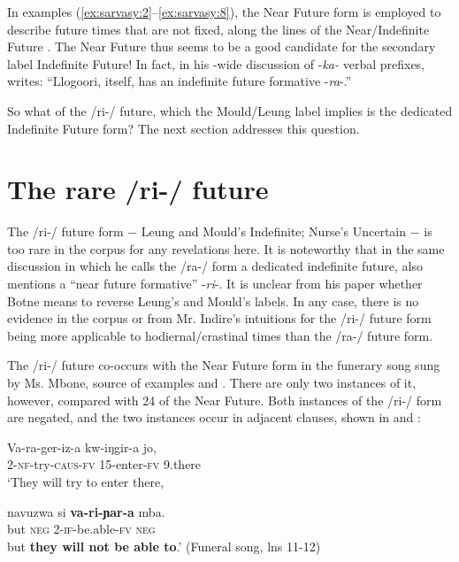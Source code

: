 \documentclass[output=paper]{langsci/langscibook}
\begin{document}
In examples (\ref{ex:sarvasy:2}--\ref{ex:sarvasy:8}), the Near Future form is employed to describe future times that are not fixed, along the lines of the  Near/Indefinite Future \citep[20]{Johnson1977}. The  Near Future thus seems to be a good candidate for the secondary label Indefinite Future! In fact, in his -wide discussion of -\textit{ka-} verbal prefixes, \citet[492]{Botne1999} writes: “Llogoori, itself, has an indefinite future formative -\textit{ra}-.” 

So what of the  /ri-/ future, which the Mould/Leung label implies is the dedicated Indefinite Future form? The next section addresses this question.

\section[The rare /ri-/ future]{The rare /ri-/ future}
\label{sec:sarvasy:4}

The /ri-/ future form $-$ Leung and Mould’s Indefinite; Nurse’s Uncertain $-$ is too rare in the corpus for any revelations here. It is noteworthy that in the same discussion in which he calls the  /ra-/ form a dedicated indefinite future, \citet[491]{Botne1999} also mentions a  “near future formative” -\textit{ri}-. It is unclear from his paper whether Botne means to reverse Leung’s and Mould’s labels. In any case, there is no evidence in the corpus or from Mr. Indire’s intuitions for the /ri-/ future form being more applicable to hodiernal/crastinal times than the /ra-/ future form.

The /ri-/ future co-occurs with the Near Future form in the funerary song sung by Ms. Mbone, source of examples  and . There are only two instances of it, however, compared with 24 of the Near Future. Both instances of the /ri-/ form are negated, and the two instances occur in adjacent clauses, shown in  and :

\ea\label{ex:sarvasy:9}
\gll Va-ra-ger-iz-a     kw-iŋgir-a   jo,\\ 
2-\textsc{nf}-try\textsc{-caus-fv}  15-enter-\textsc{fv}  9.there\\ 
\glt ‘They will try to enter there,

\gll navuzwa   si   \textbf{va-ri-ɲar-a}     mba. \\
but    \textsc{neg}  2-\textsc{if-}be.able-\textsc{fv}  \textsc{neg} \\
\glt but \textbf{they will not be able to}.’ (Funeral song, lns 11-12)
\z
\end{document}

